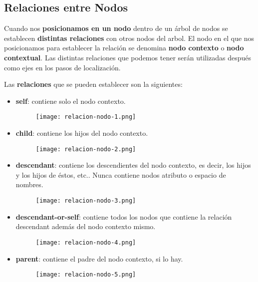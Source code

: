 \subsection{Relaciones entre Nodos}
Cuando nos \textbf{posicionamos en un nodo} dentro de un árbol de nodos se establecen \textbf{distintas relaciones} con otros nodos del arbol. El nodo en el que nos posicionamos para establecer la relación se denomina \textbf{nodo contexto} o \textbf{nodo contextual}. Las distintas relaciones que podemos tener serán utilizadas después como ejes en los pasos de localización.

Las \textbf{relaciones} que se pueden establecer son la siguientes:

\begin{itemize}
    \item \textbf{self}: contiene solo el nodo contexto.
    \begin{figure}[H]
        \centering
        \texttt{[image: relacion-nodo-1.png]}
    \end{figure}

    \item \textbf{child}: contiene los hijos del nodo contexto.
    \begin{figure}[H]
        \centering
        \texttt{[image: relacion-nodo-2.png]}
    \end{figure}

    \item \textbf{descendant}: contiene los descendientes del nodo contexto, es decir, los hijos y los hijos de éstos, etc.. Nunca contiene nodos atributo o espacio de nombres.
    \begin{figure}[H]
        \centering
        \texttt{[image: relacion-nodo-3.png]}
    \end{figure}

    \item \textbf{descendant-or-self}: contiene todos los nodos que contiene la relación descendant además del nodo contexto mismo.
    \begin{figure}[H]
        \centering
        \texttt{[image: relacion-nodo-4.png]}
    \end{figure}

    \item \textbf{parent}: contiene el padre del nodo contexto, si lo hay.
    \begin{figure}[H]
        \centering
        \texttt{[image: relacion-nodo-5.png]}
    \end{figure}


\end{itemize}
